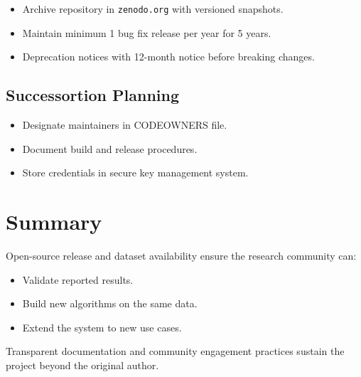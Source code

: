 \begin{itemize}
    \item Archive repository in \texttt{zenodo.org} with versioned snapshots.
    \item Maintain minimum 1 bug fix release per year for 5 years.
    \item Deprecation notices with 12-month notice before breaking changes.
\end{itemize}

\subsection{Successortion Planning}

\begin{itemize}
    \item Designate maintainers in CODEOWNERS file.
    \item Document build and release procedures.
    \item Store credentials in secure key management system.
\end{itemize}

\section{Summary}

Open-source release and dataset availability ensure the research community can:
\begin{itemize}
    \item Validate reported results.
    \item Build new algorithms on the same data.
    \item Extend the system to new use cases.
\end{itemize}

Transparent documentation and community engagement practices sustain the project beyond the original author.

\newpage